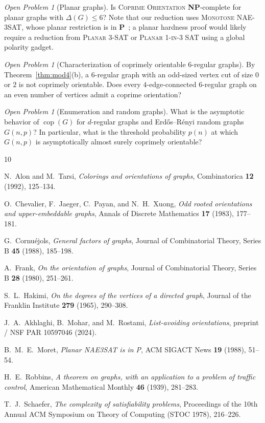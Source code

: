 \documentclass[11pt,a4paper]{article}
\theoremstyle{definition}
\theoremstyle{remark}
\newtheorem{problem}[theorem]{Open Problem}
\newcommand{\cop}{\operatorname{cop}}
\begin{document}
\begin{problem}[Planar graphs]
Is \textsc{Coprime Orientation} \textbf{NP}-complete for planar graphs with $\Delta(G) \le 6$? Note that our reduction uses \textsc{Monotone NAE-3SAT}, whose planar restriction is in \textbf{P}~\cite{Moret1988}; a planar hardness proof would likely require a reduction from \textsc{Planar 3-SAT} or \textsc{Planar 1-in-3 SAT} using a global polarity gadget.
\end{problem}

\begin{problem}[Characterization of coprimely orientable $6$-regular graphs]
By Theorem~\ref{thm:mod4}(b), a $6$-regular graph with an odd-sized vertex cut of size $0$ or $2$ is not coprimely orientable. Does every $4$-edge-connected $6$-regular graph on an even number of vertices admit a coprime orientation?
\end{problem}

\begin{problem}[Enumeration and random graphs]
What is the asymptotic behavior of $\cop(G)$ for $d$-regular graphs and Erd\H{o}s--R\'enyi random graphs $G(n, p)$? In particular, what is the threshold probability $p(n)$ at which $G(n, p)$ is asymptotically almost surely coprimely orientable?
\end{problem}

\begin{thebibliography}{10}

N.~Alon and M.~Tarsi,
\emph{Colorings and orientations of graphs},
Combinatorica \textbf{12} (1992), 125--134.

O.~Chevalier, F.~Jaeger, C.~Payan, and N.~H.~Xuong,
\emph{Odd rooted orientations and upper-embeddable graphs},
Annals of Discrete Mathematics \textbf{17} (1983), 177--181.

G.~Cornu\'ejols,
\emph{General factors of graphs},
Journal of Combinatorial Theory, Series B \textbf{45} (1988), 185--198.

A.~Frank,
\emph{On the orientation of graphs},
Journal of Combinatorial Theory, Series B \textbf{28} (1980), 251--261.

S.~L.~Hakimi,
\emph{On the degrees of the vertices of a directed graph},
Journal of the Franklin Institute \textbf{279} (1965), 290--308.

J.~A.~Akhlaghi, B.~Mohar, and M.~Rostami,
\emph{List-avoiding orientations},
preprint / NSF PAR 10597046 (2024).

B.~M.~E.~Moret,
\emph{Planar NAE3SAT is in P},
ACM SIGACT News \textbf{19} (1988), 51--54.

H.~E.~Robbins,
\emph{A theorem on graphs, with an application to a problem of traffic control},
American Mathematical Monthly \textbf{46} (1939), 281--283.

T.~J.~Schaefer,
\emph{The complexity of satisfiability problems},
Proceedings of the 10th Annual ACM Symposium on Theory of Computing (STOC 1978), 216--226.

\end{thebibliography}
\end{document}
